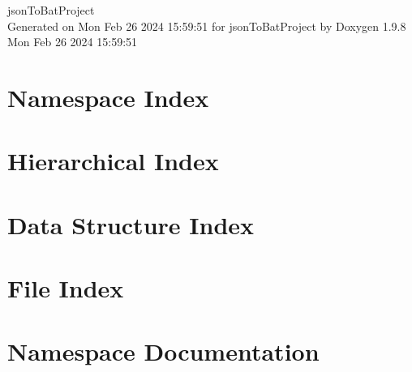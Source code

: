 \documentclass[twoside]{book}
\newcommand{\+}{\discretionary{\mbox{\scriptsize$\hookleftarrow$}}{}{}}
\newcommand{\clearemptydoublepage}{%
    \newpage{\pagestyle{empty}\cleardoublepage}%
  }
\begin{document}
  \raggedbottom
    \hypersetup{pageanchor=false,
                bookmarksnumbered=true,
                pdfencoding=unicode
               }
  \begin{titlepage}
  \vspace*{7cm}
  \begin{center}%
  {\Large json\+To\+Bat\+Project}\\
  \vspace*{1cm}
  {\large Generated on Mon Feb 26 2024 15\+:59\+:51 for json\+To\+Bat\+Project by Doxygen 1.9.8}\\
    \vspace*{0.5cm}
    {\small Mon Feb 26 2024 15:59:51}
  \end{center}
  \end{titlepage}
  \clearemptydoublepage
  \tableofcontents
  \clearemptydoublepage
  \hypersetup{pageanchor=true}



\chapter{Namespace Index}

\chapter{Hierarchical Index}

\chapter{Data Structure Index}

\chapter{File Index}

\chapter{Namespace Documentation}












\end{document}
